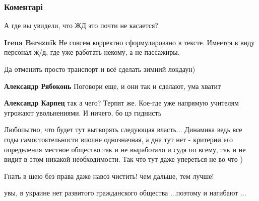  
 
 
 
 
\subsubsection{Коментарі}

\begin{itemize} %
А где вы увидели, что ЖД это почти не касается?

\begin{itemize} %
\textbf{Irena Bereznik} Не совсем корректно сформулировано в тексте. Имеется в виду персонал ж/д, где уже работать некому, а не пассажиры.
\end{itemize} %

Да отменить просто транспорт и всё сделать зимний локдаун)

\begin{itemize} %
\textbf{Александр Рябоконь} Поговори еще, и они так и сделают, ума хватит

\textbf{Александр Карпец} так а чего? Терпят же. Кое-где уже напрямую учителям угрожают увольнениями. И ничего, бо цэ гиднисть
\end{itemize} %


Любопытно, что будет тут вытворять следующая власть... Динамика ведь все годы
самостоятельности вполне однозначная, а дна тут нет - критерии его определения
местное общество так и не выработало и судя по всему, так и не видит в этом
никакой необходимости. Так что тут даже упереться не во что )

Гнать в шею без права даже навоз чистить! чем дальше, тем лучше!

увы, в украине нет развитого гражданского общества ...поэтому и нагибают ...

\end{itemize} %
